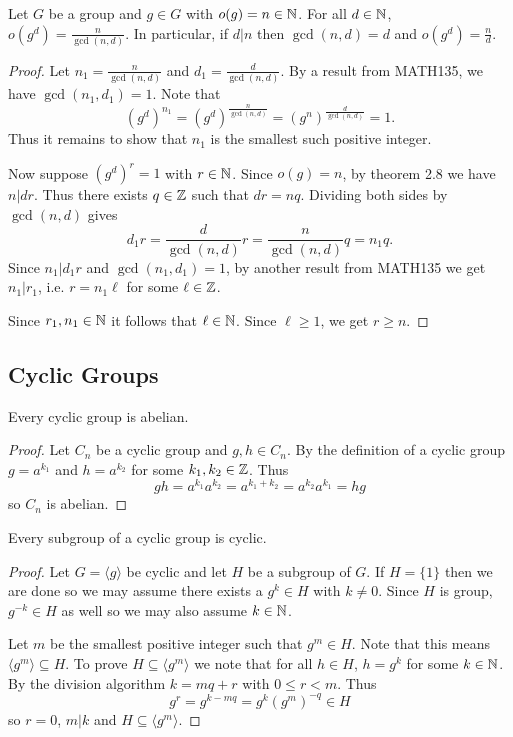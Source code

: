 \documentclass[11pt]{article}
\begin{document}
\begin{proposition}
    Let $G$ be a group and $g\in G$ with $o(g)=n\in\mathbb{N}$. For all $d\in\mathbb{N}$, $o(g^d)=\frac{n}{\gcd(n,d)}$. In particular, if $d|n$ then $\gcd(n,d)=d$ and $o(g^d)=\frac{n}{d}$.
\end{proposition}

\begin{proof}
    Let $n_1=\frac{n}{\gcd(n,d)}$ and $d_1=\frac{d}{\gcd(n,d)}$. By a result from MATH135, we have $\gcd(n_1,d_1)=1$. Note that
    \[(g^d)^{n_1}=(g^d)^{\frac{n}{\gcd(n,d)}}=(g^n)^{\frac{d}{\gcd(n,d)}}=1.\]
    Thus it remains to show that $n_1$ is the smallest such positive integer.
    
    Now suppose $(g^d)^r=1$ with $r\in\mathbb{N}$. Since $o(g)=n$, by theorem 2.8 we have $n|dr$. Thus there exists $q\in\mathbb{Z}$ such that $dr=nq$. Dividing both sides by $\gcd(n,d)$ gives
    \[d_1r=\frac{d}{\gcd(n,d)}r=\frac{n}{\gcd(n,d)}q=n_1q.\]
    Since $n_1|d_1r$ and $\gcd(n_1,d_1)=1$, by another result from MATH135 we get $n_1|r_1$, i.e. $r=n_1\ell$ for some $\ell\in\mathbb{Z}$.
    
    Since $r_1,n_1\in\mathbb{N}$ it follows that $\ell\in\mathbb{N}$. Since $\ell\geq1$, we get $r\geq n$.
\end{proof}

\subsection{Cyclic Groups}

\begin{proposition}
    Every cyclic group is abelian.
\end{proposition}

\begin{proof}
    Let $C_n$ be a cyclic group and $g,h\in C_n$. By the definition of a cyclic group $g=a^{k_1}$ and $h=a^{k_2}$ for some $k_1,k_2\in\mathbb{Z}$. Thus
    \[gh=a^{k_1}a^{k_2}=a^{k_1+k_2}=a^{k_2}a^{k_1}=hg\]
    so $C_n$ is abelian.
\end{proof}

\begin{proposition}
    Every subgroup of a cyclic group is cyclic.
\end{proposition}

\begin{proof}
    Let $G=\langle g\rangle$ be cyclic and let $H$ be a subgroup of $G$. If $H=\{1\}$ then we are done so we may assume there exists a $g^k\in H$ with $k\neq 0$. Since $H$ is group, $g^{-k}\in H$ as well so we may also assume $k\in\mathbb{N}$.

    Let $m$ be the smallest positive integer such that $g^m\in H$. Note that this means $\langle g^m\rangle\subseteq H$. To prove $H\subseteq\langle g^m\rangle$ we note that for all $h\in H$, $h=g^k$ for some $k\in\mathbb{N}$. By the division algorithm $k=mq+r$ with $0\leq r<m$. Thus
    \[g^r=g^{k-mq}=g^k(g^m)^{-q}\in H\]
    so $r=0$, $m|k$ and $H\subseteq\langle g^m\rangle$.
\end{proof}
\end{document}
